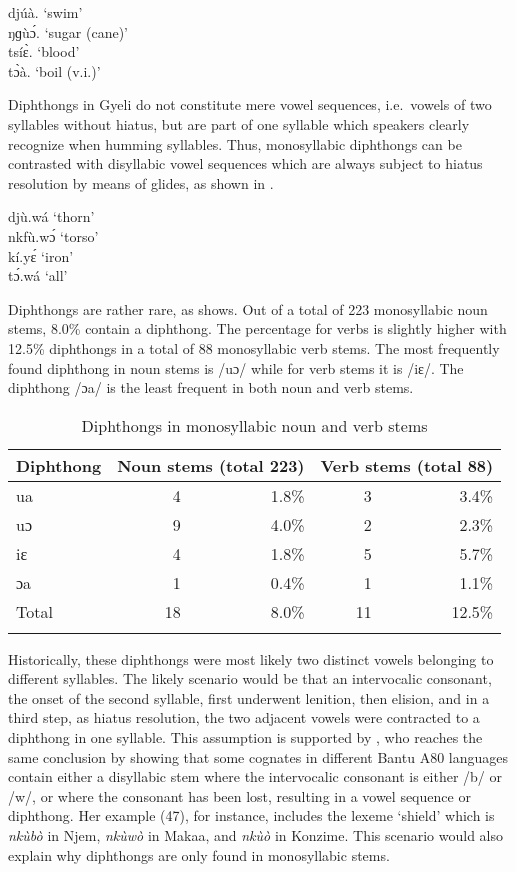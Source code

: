 \ea \label{Diph}
djúà. `swim'  \\
ŋɡùɔ́. `sugar (cane)' \\
tsíɛ̀. `blood' \\
tɔ̀à. `boil (v.i.)'
\z

Diphthongs in Gyeli do not constitute mere vowel sequences, i.e.\ vowels of two syllables without hiatus, but are part of one syllable which speakers clearly recognize when humming syllables. Thus, monosyllabic diphthongs can be contrasted with disyllabic vowel sequences which are always subject to hiatus resolution by means of glides, as shown in .

\ea \label{Hiat}
djù.wá `thorn'  \\
nkfù.wɔ́ `torso' \\
kí.yɛ́ `iron' \\
tɔ́.wá `all'
\z

Diphthongs are rather rare, as  shows. Out of a total of 223 monosyllabic noun stems, 8.0\% contain a diphthong. The percentage for verbs is slightly higher with 12.5\% diphthongs in a total of 88 monosyllabic verb stems. The most frequently found diphthong in noun stems is /uɔ/ while for verb stems it is /iɛ/. The diphthong /ɔa/ is the least frequent in both noun and verb stems.

\begin{table}
\begin{tabularx}{\textwidth}{X rrrr}
\lsptoprule
Diphthong & \multicolumn{2}{c}{Noun stems  (total 223)} & \multicolumn{2}{c}{Verb stems  (total 88)} \\  \midrule
ua		 & 	4 & 1.8\%	& 	3  & 3.4\%   \\
uɔ		& 	9 & 4.0\%	& 	2   & 2.3\%  \\
iɛ		& 	4 & 1.8\%	 & 	5  & 5.7\%   \\
ɔa	& 	1 & 0.4\%	& 	1   & 1.1\%  \\  \midrule
Total       &     18 & 8.0\%          &     11 & 12.5\%    \\
\lspbottomrule
\end{tabularx}
\caption{Diphthongs in monosyllabic noun and verb stems}
\label{Tab:Diph}
\end{table}

Historically, these diphthongs were most likely two distinct vowels belonging to different syllables. The likely scenario would be that an intervocalic consonant, the onset of the second syllable, first underwent lenition, then elision, and in a third step, as hiatus resolution, the two adjacent vowels were contracted to a diphthong in one syllable. This assumption is supported by \citet[330-331]{cheucle2014}, who reaches the same conclusion by showing that some cognates in different Bantu A80 languages contain either a disyllabic stem where the intervocalic consonant is either /b/ or /w/, or where the consonant has been lost, resulting in a vowel sequence or diphthong. Her example (47), for instance, includes the lexeme `shield' which is {\itshape nkùbò} in Njem, {\itshape nkùwò} in Makaa, and {\itshape nkùò} in Konzime.  This scenario would also explain why diphthongs are only found in monosyllabic stems. 

